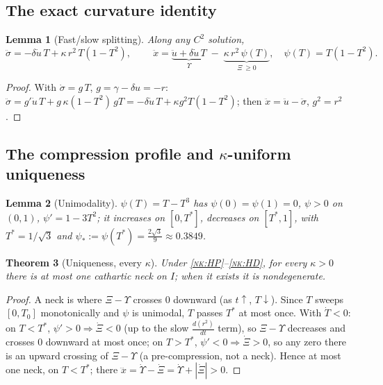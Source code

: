 \documentclass[11pt,a4paper]{article}
\theoremstyle{plain}
\newtheorem{theorem}{Theorem}[section]
\newtheorem{lemma}[theorem]{Lemma}
\theoremstyle{definition}
\theoremstyle{remark}
\begin{document}
\subsection*{The exact curvature identity}
\begin{lemma}[Fast/slow splitting]\label{nk:id}
Along any \(C^2\) solution,
\[
\ddot\sigma=-\delta\dot u\,T+\kappa\,r^2\,T(1-T^2),\qquad
\boxed{\ \ddot x=\underbrace{\ddot u+\delta\dot u\,T}_{\Upsilon}\;-\;\underbrace{\kappa\,r^2\,\psi(T)}_{\Xi\ \ge0},\quad \psi(T)=T(1-T^2).\ }
\]
\end{lemma}
\begin{proof}
With \(\dot\sigma=g\,T\), \(g=\gamma-\delta u=-r\): \(\ddot\sigma=g'\dot u\,T+g\,\kappa(1-T^2)\,gT
=-\delta\dot u\,T+\kappa g^2T(1-T^2)\); then \(\ddot x=\ddot u-\ddot\sigma\), \(g^2=r^2\).
\end{proof}

\subsection*{The compression profile and \texorpdfstring{\(\kappa\)}{kappa}-uniform uniqueness}
\begin{lemma}[Unimodality]\label{nk:psi}
\(\psi(T)=T-T^3\) has \(\psi(0)=\psi(1)=0\), \(\psi>0\) on \((0,1)\), \(\psi'=1-3T^2\); it increases
on \([0,T^*]\), decreases on \([T^*,1]\), with \(T^*=1/\sqrt3\) and
\(\psi_*:=\psi(T^*)=\tfrac{2\sqrt3}{9}\approx0.3849\).
\end{lemma}
\begin{theorem}[Uniqueness, every \(\kappa\)]\label{nk:uniq}
Under \textsc{\ref{nk:HP}--\ref{nk:HD}}, for every \(\kappa>0\) there is at most one cathartic neck on
\(I\); when it exists it is nondegenerate.
\end{theorem}
\begin{proof}
A neck is where \(\Xi-\Upsilon\) crosses \(0\) downward (as \(t\uparrow\), \(T\downarrow\)). Since
\(T\) sweeps \([0,T_0]\) monotonically and \(\psi\) is unimodal, \(T\) passes \(T^*\) at most once.
With \(\dot T<0\): on \(T<T^*\), \(\psi'>0\Rightarrow\dot\Xi<0\) (up to the slow \(\tfrac{d(r^2)}{dt}\)
term), so \(\Xi-\Upsilon\) decreases and crosses \(0\) downward at most once; on \(T>T^*\),
\(\psi'<0\Rightarrow\dot\Xi>0\), so any zero there is an upward crossing of \(\Xi-\Upsilon\) (a
pre-compression, not a neck). Hence at most one neck, on \(T<T^*\); there
\(\dddot x=\dot\Upsilon-\dot\Xi=\dot\Upsilon+|\dot\Xi|>0\).
\end{proof}
\end{document}
